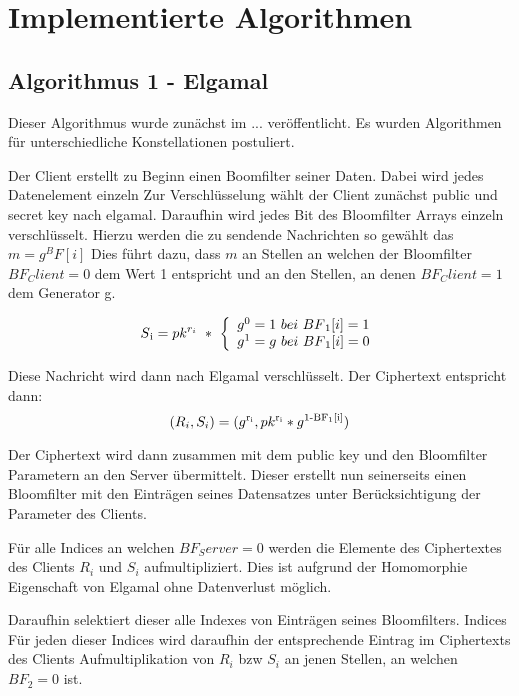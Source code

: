 \section{Implementierte Algorithmen}

\subsection{Algorithmus 1 - Elgamal}

Dieser Algorithmus wurde zunächst im ... veröffentlicht. Es wurden Algorithmen für unterschiedliche Konstellationen postuliert. 

Der Client erstellt zu Beginn einen Boomfilter seiner Daten. Dabei wird jedes Datenelement einzeln 
Zur Verschlüsselung wählt der Client zunächst public und secret key nach elgamal.
Daraufhin wird jedes Bit des Bloomfilter Arrays einzeln verschlüsselt.
Hierzu werden die zu sendende Nachrichten so gewählt das $m = g^BF[i]$
Dies führt dazu, dass $ m $ an Stellen an welchen der Bloomfilter $ BF_Client = 0 $  dem Wert 1  entspricht und an den Stellen, an denen $ BF_Client = 1 $ dem Generator g.

\[
S\textsubscript{i} = pk^{r_{i}} \ * \ \left\{
\begin{array}{ll}
g^{0} = 1 \ bei \  BF\textsubscript{1}[i]=1\\
g^{1} = g \ bei \ BF\textsubscript{1}[i]=0\\
\end{array}
\right.
\]

Diese Nachricht wird dann nach Elgamal verschlüsselt. Der Ciphertext entspricht dann:
$$(R_i, S_i) = (g \textsuperscript{r\textsubscript{i}} , pk\textsuperscript{r\textsubscript{i}} * g\textsuperscript{1-BF\textsubscript{1}[i]})$$

Der Ciphertext wird dann zusammen mit dem public key und den Bloomfilter Parametern an den Server übermittelt.
Dieser erstellt nun seinerseits einen Bloomfilter mit den Einträgen seines Datensatzes unter Berücksichtigung der Parameter des Clients. 

Für alle Indices an welchen $BF_Server = 0$ werden die Elemente des Ciphertextes des Clients $R_i$ und $S_i$ aufmultipliziert.
Dies ist aufgrund der Homomorphie Eigenschaft von Elgamal ohne Datenverlust möglich.

Daraufhin selektiert dieser alle Indexes von Einträgen seines Bloomfilters. Indices 
Für jeden dieser Indices wird daraufhin der entsprechende Eintrag im Ciphertexts des Clients 
Aufmultiplikation  von $R_i$ bzw $S_i$ an jenen Stellen, an welchen $BF_2 = 0$ ist.

